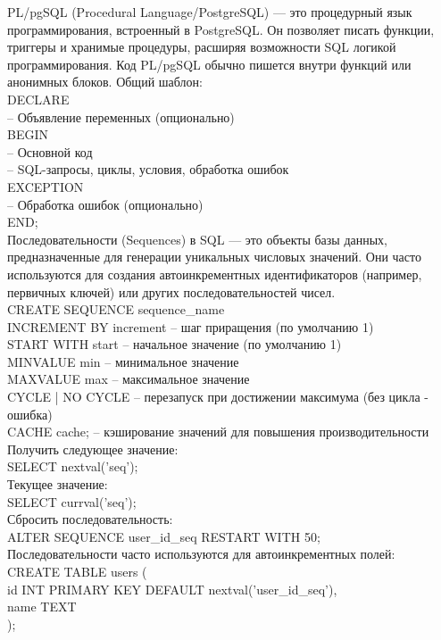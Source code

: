 \noindent PL/pgSQL (Procedural Language/PostgreSQL) — это процедурный язык программирования, встроенный в PostgreSQL. Он позволяет писать функции, триггеры и хранимые процедуры, расширяя возможности SQL логикой программирования. Код PL/pgSQL обычно пишется внутри функций или анонимных блоков. Общий шаблон: \\
DECLARE \\
  -- Объявление переменных (опционально) \\
\noindent BEGIN \\
  -- Основной код \\
  -- SQL-запросы, циклы, условия, обработка ошибок \\
\noindent EXCEPTION \\
  -- Обработка ошибок (опционально) \\
\noindent END; \\

\noindent Последовательности (Sequences) в SQL — это объекты базы данных, предназначенные для генерации уникальных числовых значений. Они часто используются для создания автоинкрементных идентификаторов (например, первичных ключей) или других последовательностей чисел. \\
CREATE SEQUENCE sequence\_name \\
    INCREMENT BY increment    -- шаг приращения (по умолчанию 1) \\
    START WITH start          -- начальное значение (по умолчанию 1) \\
    MINVALUE min              -- минимальное значение \\
    MAXVALUE max              -- максимальное значение \\
    CYCLE | NO CYCLE         -- перезапуск при достижении максимума (без цикла - ошибка) \\
    CACHE cache;              -- кэширование значений для повышения производительности \\

\noindent Получить следующее значение: \\ 
SELECT nextval('seq'); \\
Текущее значение: \\
SELECT currval('seq'); \\
Сбросить последовательность: \\
ALTER SEQUENCE user\_id\_seq RESTART WITH 50; \\
Последовательности часто используются для автоинкрементных полей: \\
CREATE TABLE users ( \\
    id INT PRIMARY KEY DEFAULT nextval('user\_id\_seq'), \\
    name TEXT \\
); \\

